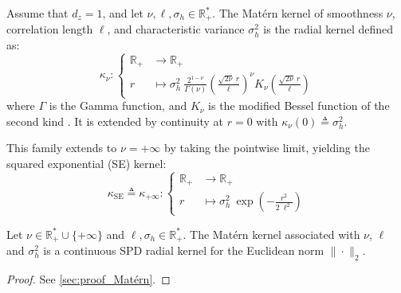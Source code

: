 \begin{definition}\label{th:Matérn}
	Assume that $d_z=1$, and let $\nu,\ell,\sigma_h\in\mathbb{R}_+^*$. The Matérn kernel of smoothness $\nu$, correlation length $\ell$, and characteristic variance $\sigma_h^2$ is the radial kernel defined as:
	\begin{equation}
		\kappa_\nu:\left\{\begin{aligned}
		\mathbb{R}_+&\to\mathbb{R}_+\\
		r&\mapsto\sigma_h^2\:\frac{2^{1-\nu}}{\Gamma(\nu)}\left(\frac{\sqrt{2\nu}\:r}{\ell}\right)^\nu K_\nu\left(\frac{\sqrt{2\nu}\:r}{\ell}\right)
		\end{aligned}\right.
	\end{equation}
	where $\Gamma$ is the Gamma function, and $K_\nu$ is the modified Bessel function of the second kind \cite{bib:Abramowitz}. It is extended by continuity at $r=0$ with $\kappa_\nu(0)\triangleq\sigma_h^2$.

	This family extends to $\nu=+\infty$ by taking the pointwise limit, yielding the squared exponential (SE) kernel:
	\begin{equation}
		\kappa_{\mathrm{SE}}\triangleq \kappa_{+\infty}:\left\{\begin{aligned}
		\mathbb{R}_+&\to\mathbb{R}_+\\
		r&\mapsto\sigma_h^2\:\exp\left(-\frac{r^2}{2\:\ell^2}\right)
		\end{aligned}\right.
	\end{equation}
\end{definition}

\begin{proposition}\label{th:Matérn_properties}
	Let $\nu\in\mathbb{R}_+^*\cup\{+\infty\}$ and $\ell,\sigma_h\in\mathbb{R}_+^*$. The Matérn kernel associated with $\nu$, $\ell$ and $\sigma_h^2$ is a continuous SPD radial kernel for the Euclidean norm $\|\cdot\|_2$.
\end{proposition}

\begin{proof}
	See \cref{sec:proof_Matérn}.
\end{proof}

